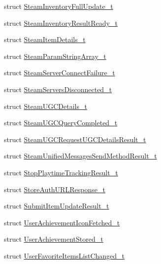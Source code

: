 \begin{DoxyCompactItemize}
\item 
struct \hyperlink{struct_valve_1_1_steamworks_1_1_steam_inventory_full_update__t}{Steam\+Inventory\+Full\+Update\+\_\+t}
\item 
struct \hyperlink{struct_valve_1_1_steamworks_1_1_steam_inventory_result_ready__t}{Steam\+Inventory\+Result\+Ready\+\_\+t}
\item 
struct \hyperlink{struct_valve_1_1_steamworks_1_1_steam_item_details__t}{Steam\+Item\+Details\+\_\+t}
\item 
struct \hyperlink{struct_valve_1_1_steamworks_1_1_steam_param_string_array__t}{Steam\+Param\+String\+Array\+\_\+t}
\item 
struct \hyperlink{struct_valve_1_1_steamworks_1_1_steam_server_connect_failure__t}{Steam\+Server\+Connect\+Failure\+\_\+t}
\item 
struct \hyperlink{struct_valve_1_1_steamworks_1_1_steam_servers_disconnected__t}{Steam\+Servers\+Disconnected\+\_\+t}
\item 
struct \hyperlink{struct_valve_1_1_steamworks_1_1_steam_u_g_c_details__t}{Steam\+U\+G\+C\+Details\+\_\+t}
\item 
struct \hyperlink{struct_valve_1_1_steamworks_1_1_steam_u_g_c_query_completed__t}{Steam\+U\+G\+C\+Query\+Completed\+\_\+t}
\item 
struct \hyperlink{struct_valve_1_1_steamworks_1_1_steam_u_g_c_request_u_g_c_details_result__t}{Steam\+U\+G\+C\+Request\+U\+G\+C\+Details\+Result\+\_\+t}
\item 
struct \hyperlink{struct_valve_1_1_steamworks_1_1_steam_unified_messages_send_method_result__t}{Steam\+Unified\+Messages\+Send\+Method\+Result\+\_\+t}
\item 
struct \hyperlink{struct_valve_1_1_steamworks_1_1_stop_playtime_tracking_result__t}{Stop\+Playtime\+Tracking\+Result\+\_\+t}
\item 
struct \hyperlink{struct_valve_1_1_steamworks_1_1_store_auth_u_r_l_response__t}{Store\+Auth\+U\+R\+L\+Response\+\_\+t}
\item 
struct \hyperlink{struct_valve_1_1_steamworks_1_1_submit_item_update_result__t}{Submit\+Item\+Update\+Result\+\_\+t}
\item 
struct \hyperlink{struct_valve_1_1_steamworks_1_1_user_achievement_icon_fetched__t}{User\+Achievement\+Icon\+Fetched\+\_\+t}
\item 
struct \hyperlink{struct_valve_1_1_steamworks_1_1_user_achievement_stored__t}{User\+Achievement\+Stored\+\_\+t}
\item 
struct \hyperlink{struct_valve_1_1_steamworks_1_1_user_favorite_items_list_changed__t}{User\+Favorite\+Items\+List\+Changed\+\_\+t}

\end{DoxyCompactItemize}
